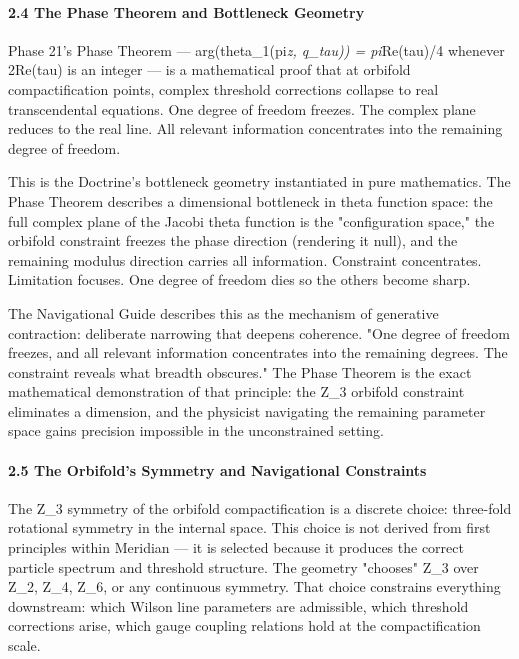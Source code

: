 \paragraph*{2.4 The Phase Theorem and Bottleneck Geometry}


Phase 21's Phase Theorem — arg(theta\_1(pi\textit{z, q\_tau)) = pi}Re(tau)/4 whenever 2Re(tau) is an integer — is a mathematical proof that at orbifold compactification points, complex threshold corrections collapse to real transcendental equations. One degree of freedom freezes. The complex plane reduces to the real line. All relevant information concentrates into the remaining degree of freedom.


This is the Doctrine's bottleneck geometry instantiated in pure mathematics. The Phase Theorem describes a dimensional bottleneck in theta function space: the full complex plane of the Jacobi theta function is the "configuration space," the orbifold constraint freezes the phase direction (rendering it null), and the remaining modulus direction carries all information. Constraint concentrates. Limitation focuses. One degree of freedom dies so the others become sharp.


The Navigational Guide describes this as the mechanism of generative contraction: deliberate narrowing that deepens coherence. "One degree of freedom freezes, and all relevant information concentrates into the remaining degrees. The constraint reveals what breadth obscures." The Phase Theorem is the exact mathematical demonstration of that principle: the Z\_3 orbifold constraint eliminates a dimension, and the physicist navigating the remaining parameter space gains precision impossible in the unconstrained setting.


\paragraph*{2.5 The Orbifold's Symmetry and Navigational Constraints}


The Z\_3 symmetry of the orbifold compactification is a discrete choice: three-fold rotational symmetry in the internal space. This choice is not derived from first principles within Meridian — it is selected because it produces the correct particle spectrum and threshold structure. The geometry "chooses" Z\_3 over Z\_2, Z\_4, Z\_6, or any continuous symmetry. That choice constrains everything downstream: which Wilson line parameters are admissible, which threshold corrections arise, which gauge coupling relations hold at the compactification scale.


